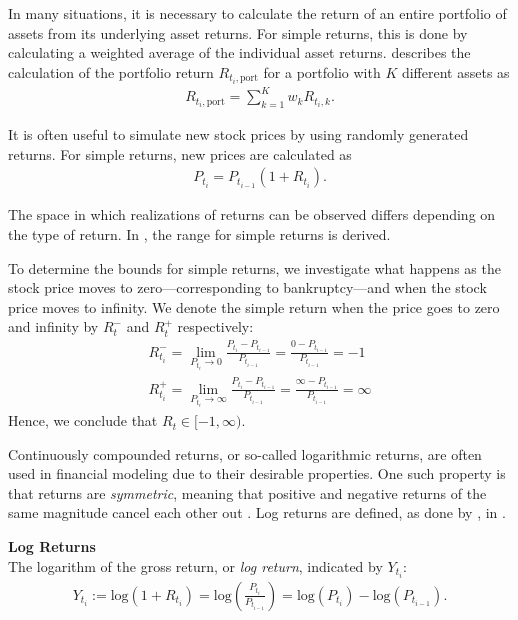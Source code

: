 In many situations, it is necessary to calculate the return of an entire portfolio of assets from its underlying asset returns. For simple returns, this is done by calculating a weighted average of the individual asset returns. \citet[p.~3]{Danielsson2011} describes the calculation of the portfolio return $R_{t_i,\mathrm{port}}$ for a portfolio with $K$ different assets as 
\begin{align*}
    R_{t_i,\mathrm{port}} = \sum_{k=1}^K w_k R_{t_i,k}.
\end{align*}

It is often useful to simulate new stock prices by using randomly generated returns. For simple returns, new prices are calculated as
\begin{align*}
    P_{t_{i}} = P_{t_{i-1}}(1+R_{t_{i}}).
\end{align*}

The space in which realizations of returns can be observed differs depending on the type of return. In , the range for simple returns is derived. 

\begin{example}\label{ex:BoundsSimpleReturns}
    To determine the bounds for simple returns, we investigate what happens as the stock price moves to zero—corresponding to bankruptcy—and when the stock price moves to infinity. We denote the simple return when the price goes to zero and infinity by $R_t^-$ and $R_t^+$ respectively:   
    \begin{align*}
        R_{t_i}^- = \lim_{P_{t_i} \to 0} \frac{P_{t_i}-P_{t_{i-1}}}{P_{t_{i-1}}} = \frac{0-P_{t_{i-1}}}{P_{t_{i-1}}} = -1 \\
        R_{t_i}^+ = \lim_{P_{t_i} \to \infty} \frac{P_{t_i}-P_{t_{i-1}}}{P_{t_{i-1}}} = \frac{\infty-P_{t_{i-1}}}{P_{t_{i-1}}} = \infty    
    \end{align*}
    Hence, we conclude that $R_t \in [ -1,\infty )$. 
\end{example}

Continuously compounded returns, or so-called logarithmic returns, are often used in financial modeling due to their desirable properties. One such property is that returns are \emph{symmetric}, meaning that positive and negative returns of the same magnitude cancel each other out \citet[p.~4]{Danielsson2011}. Log returns are defined, as done by \citet[p.~3]{Danielsson2011}, in . 

\begin{definition}\label{def:logReturns}
    \textbf{Log Returns} \\
    The logarithm of the gross return, or \emph{log return}, indicated by $Y_{t_i}$:
    \begin{align*}
        Y_{t_i} := \mathrm{log}(1+R_{t_i}) = \mathrm{log} \left(\frac{P_{t_i}}{P_{t_{i-1}}}\right) = \mathrm{log}(P_{t_i}) - \mathrm{log}(P_{t_{i-1}}).
    \end{align*}
\end{definition}

